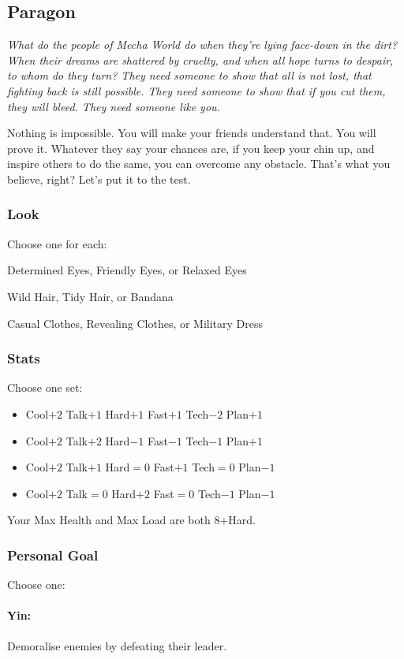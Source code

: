 \subsection{Paragon}

{\itshape What do the people of Mecha World do when they're lying
  face-down in the dirt? When their dreams are shattered by cruelty,
  and when all hope turns to despair, to whom do they turn? They need
  someone to show that all is not lost, that fighting back is still
  possible. They need someone to show that if you cut them, they
  \emph{will} bleed. They need someone like you.

Nothing is impossible. You will make your friends understand that. You
will prove it. Whatever they say your chances are, if you keep your
chin up, and inspire others to do the same, you can overcome any
obstacle. That's what you believe, right? Let's put it to the test.}

\subsubsection{Look}
Choose one for each:

Determined Eyes, Friendly Eyes, or Relaxed Eyes

Wild Hair, Tidy Hair, or Bandana

Casual Clothes, Revealing Clothes, or Military Dress

\subsubsection{Stats}
Choose one set:
\begin{itemize}
\setlength\itemsep{0em}
\item Cool$+2$ Talk$+1$ Hard$+1$ Fast$+1$ Tech$-2$ Plan$+1$
\item Cool$+2$ Talk$+2$ Hard$-1$ Fast$-1$ Tech$-1$ Plan$+1$
\item Cool$+2$ Talk$+1$ Hard${=}0$ Fast$+1$ Tech${=}0$ Plan$-1$
\item Cool$+2$ Talk${=}0$ Hard$+2$ Fast${=}0$ Tech$-1$ Plan$-1$
\end{itemize}

Your Max Health and Max Load are both 8+Hard.

\subsubsection{Personal Goal}
Choose one:
\paragraph{Yin:} Demoralise enemies by defeating their leader.
